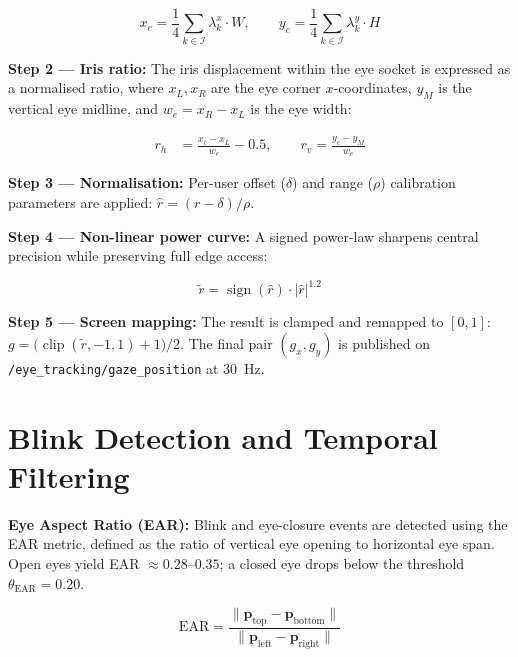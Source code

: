 \begin{equation}
    x_c = \frac{1}{4} \sum_{k \in \mathcal{I}} \lambda_k^x \cdot W, \qquad
    y_c = \frac{1}{4} \sum_{k \in \mathcal{I}} \lambda_k^y \cdot H
    \label{eq:iris_centre}
\end{equation}

\textbf{Step 2 — Iris ratio:} The iris displacement within the eye socket is expressed as a
normalised ratio, where $x_L, x_R$ are the eye corner $x$-coordinates, $y_M$ is the
vertical eye midline, and $w_e = x_R - x_L$ is the eye width:

\begin{align}
    r_h &= \frac{x_c - x_L}{w_e} - 0.5, \qquad
    r_v  = \frac{y_c - y_M}{w_e}
    \label{eq:ratios}
\end{align}

\textbf{Step 3 — Normalisation:} Per-user offset ($\delta$) and range ($\rho$) calibration
parameters are applied:
$\hat{r} = (r - \delta) / \rho$.

\textbf{Step 4 — Non-linear power curve:} A signed power-law sharpens central precision
while preserving full edge access:

\begin{equation}
    \tilde{r} = \operatorname{sign}(\hat{r}) \cdot |\hat{r}|^{1.2}
    \label{eq:power_curve}
\end{equation}

\textbf{Step 5 — Screen mapping:} The result is clamped and remapped to $[0, 1]$: \newline
$g = \bigl(\operatorname{clip}(\tilde{r}, -1, 1) + 1\bigr) / 2$.
The final pair $(g_x, g_y)$ is published on \newline \texttt{/eye\_tracking/gaze\_position} at 30~Hz.

\section{Blink Detection and Temporal Filtering}

\textbf{Eye Aspect Ratio (EAR):} Blink and eye-closure events are detected using the
EAR metric, defined as the ratio of vertical eye opening to horizontal
eye span. Open eyes yield EAR $\approx 0.28$--$0.35$; a closed eye drops below the
threshold $\theta_{\text{EAR}} = 0.20$.

\begin{equation}
    \text{EAR} = \frac{\| \mathbf{p}_{\text{top}} - \mathbf{p}_{\text{bottom}} \|}
                      {\| \mathbf{p}_{\text{left}} - \mathbf{p}_{\text{right}} \|}
    \label{eq:ear}
\end{equation}

